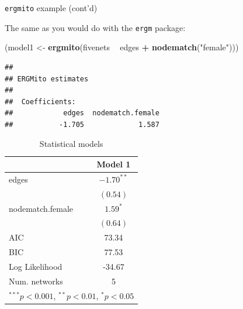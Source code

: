 \documentclass[10pt,ignorenonframetext,aspectratio=169,]{beamer}
\newenvironment{Shaded}{\begin{snugshade}}{\end{snugshade}}
\newcommand{\KeywordTok}[1]{\textcolor[rgb]{0.13,0.29,0.53}{\textbf{#1}}}
\newcommand{\NormalTok}[1]{#1}
\newcommand{\OperatorTok}[1]{\textcolor[rgb]{0.81,0.36,0.00}{\textbf{#1}}}
\newcommand{\StringTok}[1]{\textcolor[rgb]{0.31,0.60,0.02}{#1}}
\begin{document}
\begin{frame}[fragile]{\texttt{ergmito} example (cont'd)}
\protect\hypertarget{ergmito-example-contd}{}

The same as you would do with the \texttt{ergm} package:

\scriptsize

\begin{Shaded}
\begin{Highlighting}[]
\NormalTok{(model1 <-}\StringTok{ }\KeywordTok{ergmito}\NormalTok{(fivenets }\OperatorTok{~}\StringTok{ }\NormalTok{edges }\OperatorTok{+}\StringTok{ }\KeywordTok{nodematch}\NormalTok{(}\StringTok{"female"}\NormalTok{)))}
\end{Highlighting}
\end{Shaded}

\begin{verbatim}
## 
## ERGMito estimates
## 
##  Coefficients:
##            edges  nodematch.female  
##           -1.705             1.587
\end{verbatim}

\normalsize

\scriptsize

\begin{table}
\begin{center}
\begin{tabular}{l c }
\hline
 & Model 1 \\
\hline
edges            & $-1.70^{**}$ \\
                 & $(0.54)$     \\
nodematch.female & $1.59^{*}$   \\
                 & $(0.64)$     \\
\hline
AIC              & 73.34        \\
BIC              & 77.53        \\
Log Likelihood   & -34.67       \\
Num. networks    & 5            \\
\hline
\multicolumn{2}{l}{\scriptsize{$^{***}p<0.001$, $^{**}p<0.01$, $^*p<0.05$}}
\end{tabular}
\caption{Statistical models}
\label{table:coefficients}
\end{center}
\end{table}

\normalsize

\end{frame}
\end{document}
